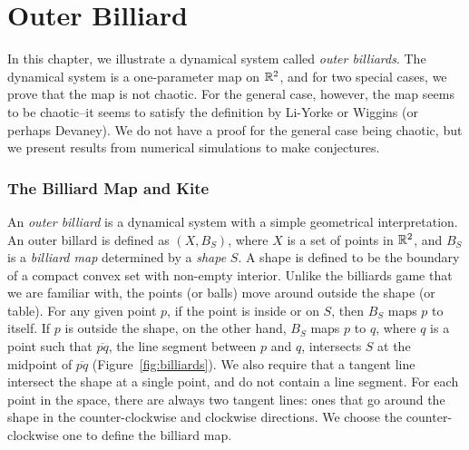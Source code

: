 \documentclass[12pt,twoside]{book}
\begin{document}
\label{chap:billiards}
\chapter{Outer Billiard}
In this chapter, we illustrate a dynamical system called \textit{outer billiards}.
The dynamical system is a one-parameter map on $\mathbb{R}^2$, and for two special cases, we prove that the map is not chaotic.
For the general case, however, the map seems to be chaotic--it seems to satisfy the definition by Li-Yorke or Wiggins (or perhaps Devaney).
We do not have a proof for the general case being chaotic, but we present results from numerical simulations to make conjectures.

\subsection*{The Billiard Map and Kite}
An \textit{outer billiard} is a dynamical system with a simple geometrical interpretation.
An outer billard is defined as $(X, B_S)$, where $X$ is a set of points in $\mathbb{R}^2$, and $B_S$ is a \textit{billiard map} determined by a \textit{shape} $S$.
A shape is defined to be the boundary of a compact convex set with non-empty interior.
Unlike the billiards game that we are familiar with, the points (or balls) move around outside the shape (or table).
For any given point $p$, if the point is inside or on $S$, then $B_S$ maps $p$ to itself.
If $p$ is outside the shape, on the other hand, $B_S$ maps $p$ to $q$, where $q$ is a point such that $\overline{pq}$, the line segment between $p$ and $q$, intersects $S$ at the midpoint of $\overline{pq}$ (Figure~\ref{fig:billiards}).
We also require that a tangent line intersect the shape at a single point, and do not contain a line segment.
For each point in the space, there are always two tangent lines: ones that go around the shape in the counter-clockwise and clockwise directions.
We choose the counter-clockwise one to define the billiard map.
\end{document}

